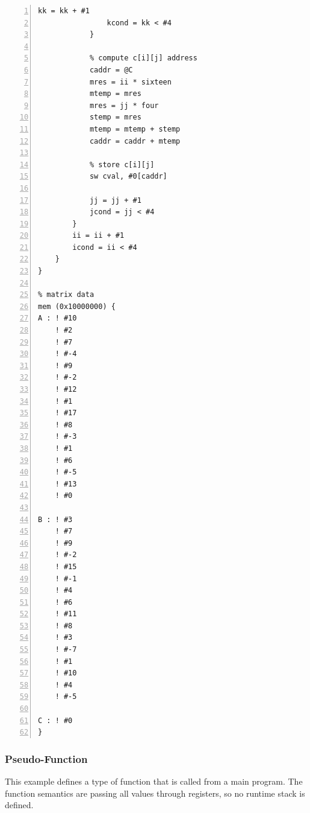 \begin{lstlisting}[label=code:matmult,caption=Matrix multiplication example source code,basicstyle=\footnotesize,numbers=left,numberstyle=\tiny,stepnumber=1, numbersep=6pt,frame=single,captionpos=b,escapechar=`]
                kk = kk + #1
                kcond = kk < #4
            }

            % compute c[i][j] address
            caddr = @C
            mres = ii * sixteen
            mtemp = mres
            mres = jj * four
            stemp = mres
            mtemp = mtemp + stemp
            caddr = caddr + mtemp

            % store c[i][j]
            sw cval, #0[caddr]

            jj = jj + #1
            jcond = jj < #4
        }
        ii = ii + #1
        icond = ii < #4
    }
}

% matrix data
mem (0x10000000) {
A : ! #10
    ! #2
    ! #7
    ! #-4
    ! #9
    ! #-2
    ! #12
    ! #1
    ! #17
    ! #8
    ! #-3
    ! #1
    ! #6
    ! #-5
    ! #13
    ! #0

B : ! #3
    ! #7
    ! #9
    ! #-2
    ! #15
    ! #-1
    ! #4
    ! #6
    ! #11
    ! #8
    ! #3
    ! #-7
    ! #1
    ! #10
    ! #4
    ! #-5

C : ! #0
}
\end{lstlisting}

\subsubsection{Pseudo-Function}

This example defines a type of function that is called from a 
main program.  The function semantics are passing all values
through registers, so no runtime stack is defined.
